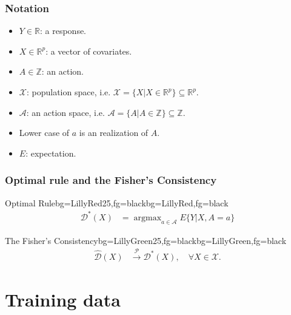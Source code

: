 \documentclass{beamer}
\def\conP{\stackrel{\cal P} {\rightarrow}}        %
\DeclareMathOperator*{\argmax}{argmax}
\def\hat{\widehat}
\def\cal{\mathcal}
\def\calA{{\cal A}} %
\def\calX{{\cal X}} %
\def\calD{{\cal D}} %
\def\bbR{{\mathbb{R}}} %
\def\bbZ{{\mathbb{Z}}} %
\begin{document}
\begin{frame}
\frametitle{Notation}
\begin{itemize}
	\item $Y \in \bbR $: a response.
	\item $X \in \bbR^p$: a vector of covariates.
	\item $A \in \bbZ$: an action.
	\item $\calX$: population space, i.e. $\calX = \{X| X \in \bbR^p\} \subseteq \bbR^p$. 
	\item $\calA$: an action space, i.e. $\calA =\{A| A \in \bbZ \} \subseteq \bbZ$.
	\item Lower case of  $a$ is an realization of $A$.
	\item $E$: expectation.
\end{itemize}
\end{frame}	
	
\begin{frame}
\frametitle{Optimal rule and the Fisher's Consistency}
\begin{variableblock}{Optimal Rule}{bg=LillyRed25,fg=black}{bg=LillyRed,fg=black}
\begin{align*}
\calD^*(X) & = \argmax_{a \in \calA}  E\{Y|X, A=a\}
\end{align*} 
\vspace{0.05in}
\end{variableblock}

\pause
\begin{variableblock}{The Fisher's Consistency}{bg=LillyGreen25,fg=black}{bg=LillyGreen,fg=black}
	\begin{align*}
	\hat{\calD}(X) & \conP \calD^*(X), \quad \forall X \in \calX. 
	\end{align*} 
	\vspace{0.03in}
\end{variableblock}
\end{frame}	


\section{Training data}
\end{document}
